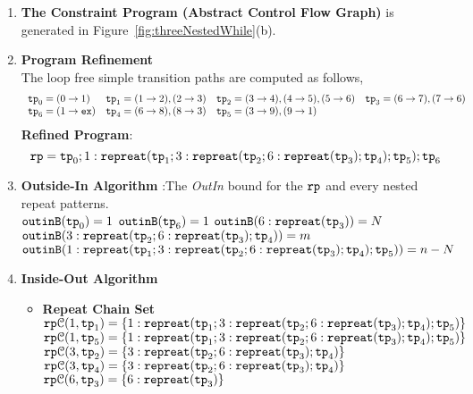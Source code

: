 \begin{enumerate}
  \item  \textbf{The Constraint Program (Abstract Control Flow Graph)} is generated in Figure~\ref{fig:threeNestedWhile}(b).

  \item \textbf{Program Refinement}
  \\
  The loop free simple transition paths are computed as follows,
  \[
      \begin{array}{llll}
          \mathtt{tp}_0 = (0 \to 1)
          &
          \mathtt{tp}_1 = (1 \to 2), (2 \to 3)
          &           
          \mathtt{tp}_2 = (3 \to 4), (4 \to 5), (5 \to 6)
          &
          \mathtt{tp}_3 = (6 \to 7), (7 \to 6)
          \\
          \mathtt{tp}_6 = (1 \to \mathtt{ex})
          &
          \mathtt{tp}_4 = (6 \to 8), (8 \to 3)
          &
          \mathtt{tp}_5 = (3 \to 9), (9 \to 1)
      \end{array}
      \]
  \textbf{Refined Program}:
  \[
  \mathtt{rp} = \mathtt{tp}_0 ; 1: \mathtt{repreat}(\mathtt{tp}_1; 3: \mathtt{repreat}(\mathtt{tp}_2; 6 : \mathtt{repreat}(\mathtt{tp}_3); \mathtt{tp}_4); \mathtt{tp}_5); \mathtt{tp}_6
  \]
  \item \textbf{Outside-In Algorithm} :The \emph{OutIn} bound for the $\mathtt{rp}$ and every nested repeat patterns.
  \\
$\mathtt{outinB}(\mathtt{tp}_0) = 1$
\quad
$\mathtt{outinB}(\mathtt{tp}_6) = 1$
\quad
$\mathtt{outinB}(6 : \mathtt{repreat}(\mathtt{tp}_3)) = N $
\\
$\mathtt{outinB}(3: \mathtt{repreat}(\mathtt{tp}_2; 6 : \mathtt{repreat}(\mathtt{tp}_3); \mathtt{tp}_4)) = m $
\\
$\mathtt{outinB}(1: \mathtt{repreat}(\mathtt{tp}_1; 3: \mathtt{repreat}(\mathtt{tp}_2; 6 : \mathtt{repreat}(\mathtt{tp}_3); \mathtt{tp}_4); \mathtt{tp}_5)) = n - N $
\item \textbf{Inside-Out Algorithm}
\begin{itemize}
  \item \textbf{Repeat Chain Set}
  \\
  $\mathtt{rp}\mathcal{C}(1, \mathtt{tp}_1) = \{1: \mathtt{repreat}(\mathtt{tp}_1; 3: \mathtt{repreat}(\mathtt{tp}_2; 6 : \mathtt{repreat}(\mathtt{tp}_3); \mathtt{tp}_4); \mathtt{tp}_5)\}$
  \\
  $\mathtt{rp}\mathcal{C}(1, \mathtt{tp}_5) = \{1: \mathtt{repreat}(\mathtt{tp}_1; 3: \mathtt{repreat}(\mathtt{tp}_2; 6 : \mathtt{repreat}(\mathtt{tp}_3); \mathtt{tp}_4); \mathtt{tp}_5)\}$
  \\
  $\mathtt{rp}\mathcal{C}(3, \mathtt{tp}_2) = \{3: \mathtt{repreat}(\mathtt{tp}_2; 6 : \mathtt{repreat}(\mathtt{tp}_3); \mathtt{tp}_4)\}$
  \\
  $\mathtt{rp}\mathcal{C}(3, \mathtt{tp}_4) = \{3: \mathtt{repreat}(\mathtt{tp}_2; 6 : \mathtt{repreat}(\mathtt{tp}_3); \mathtt{tp}_4)\}$
  \\
  $\mathtt{rp}\mathcal{C}(6, \mathtt{tp}_3) = \{6: \mathtt{repreat}(\mathtt{tp}_3)\}$

\end{itemize}
\end{enumerate}
